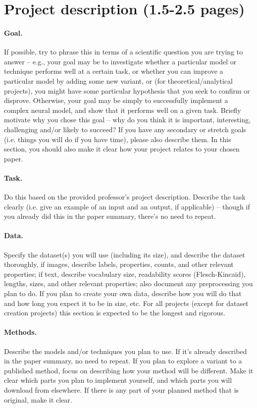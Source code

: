\documentclass{article}
\begin{document}
\section{Project description (1.5-2.5 pages)}

\paragraph{Goal.} 
If possible, try to phrase this in terms of a scientific question you are trying to answer -- e.g., your goal may be to investigate whether a particular model or technique performs well at a certain task, or whether you can improve a particular model by adding some new variant, or (for theoretical/analytical projects), you might have some particular hypothesis that you seek to confirm or disprove.
Otherwise, your goal may be simply to successfully implement a complex neural model, and show that it performs well on a given task.
Briefly motivate why you chose this goal -- why do you think it is important, interesting, challenging and/or likely to succeed?
If you have any secondary or stretch goals (i.e. things you will do if you have time), please also describe them.
In this section, you should also make it clear how your project relates to your chosen paper.

\paragraph{Task.} 
Do this based on the provided professor's project description. Describe the task clearly (i.e. give an example of an input and an output, if applicable) -- though if you already did this in the paper summary, there's no need to repeat. 

\paragraph{Data.}
Specify the dataset(s) you will use (including its size), and describe the dataset thoroughly, if images, describe labels, properties, counts, and other relevant properties; if text, describe vocabulary size, readability scores (Flesch-Kincaid), lengths, sizes, and other relevant properties; also document any preprocessing you plan to do. If you plan to create your own data, describe how you will do that and how long you expect it to be in size, etc. For all projects (except for dataset creation projects) this section is expected to be the longest and rigorous.

\paragraph{Methods.}
Describe the models and/or techniques you plan to use.
If it's already described in the paper summary, no need to repeat.
If you plan to explore a variant to a published method, focus on describing how your method will be different.
Make it clear which parts you plan to implement yourself, and which parts you will download from elsewhere. 
If there is any part of your planned method that is original, make it clear.
\end{document}
